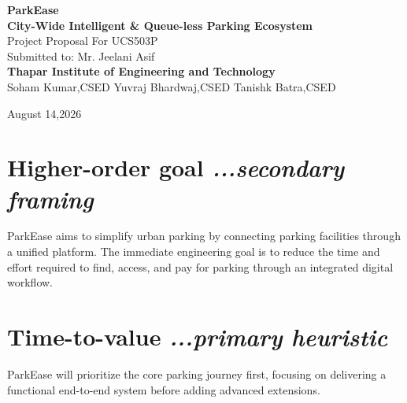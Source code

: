 \documentclass[12pt,a4paper]{article}
\begin{document}

\begin{center}

    {\LARGE \textbf{ParkEase}}\\[0.3cm]

    {\Large \textbf{City-Wide Intelligent \& Queue-less Parking Ecosystem}}\\[0.7cm]

    Project Proposal For UCS503P\\
    Submitted to: Mr. Jeelani Asif\\
    \textbf{Thapar Institute of Engineering and Technology}\\
    Soham Kumar,CSED\hspace{0.5cm}
    Yuvraj Bhardwaj,CSED\hspace{0.5cm}
    Tanishk Batra,CSED\\

    \vspace{0.5cm}

    August 14,2026

\end{center}


\section{\textbf{Higher-order goal}
\hfill
{\small\mdseries\itshape ...secondary framing}}

ParkEase aims to simplify urban parking by connecting parking facilities through a unified platform. The immediate engineering goal is to reduce the time and effort required to find, access, and pay for parking through an integrated digital workflow.


\section{\textbf{Time-to-value}
\hfill
{\small\mdseries\itshape ...primary heuristic}}

ParkEase will prioritize the core parking journey first, focusing on delivering a functional end-to-end system before adding advanced extensions.
\end{document}
